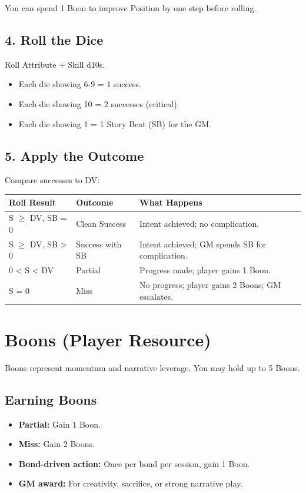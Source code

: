 \documentclass[11pt]{book}
\begin{document}
You can spend 1 Boon to improve Position by one step before rolling.

\subsection*{4. Roll the Dice}
Roll Attribute + Skill d10s.

\begin{itemize}
  \item Each die showing 6-9 = 1 success.
  \item Each die showing 10 = 2 successes (critical).
  \item Each die showing 1 = 1 Story Beat (SB) for the GM.
\end{itemize}

\subsection*{5. Apply the Outcome}
Compare successes to DV:

\begin{center}
\begin{tabular}{lll}
\toprule
\textbf{Roll Result} & \textbf{Outcome} & \textbf{What Happens} \\
\midrule
S $\ge$ DV, SB = 0 & Clean Success & Intent achieved; no complication. \\
S $\ge$ DV, SB > 0 & Success with SB & Intent achieved; GM spends SB for complication. \\
0 < S < DV & Partial & Progress made; player gains 1 Boon. \\
S = 0 & Miss & No progress; player gains 2 Boons; GM escalates. \\
\bottomrule
\end{tabular}
\end{center}

\section{Boons (Player Resource)}

Boons represent momentum and narrative leverage. You may hold up to 5 Boons.

\subsection*{Earning Boons}
\begin{itemize}
  \item \textbf{Partial:} Gain 1 Boon.
  \item \textbf{Miss:} Gain 2 Boons.
  \item \textbf{Bond-driven action:} Once per bond per session, gain 1 Boon.
  \item \textbf{GM award:} For creativity, sacrifice, or strong narrative play.
\end{itemize}
\end{document}
